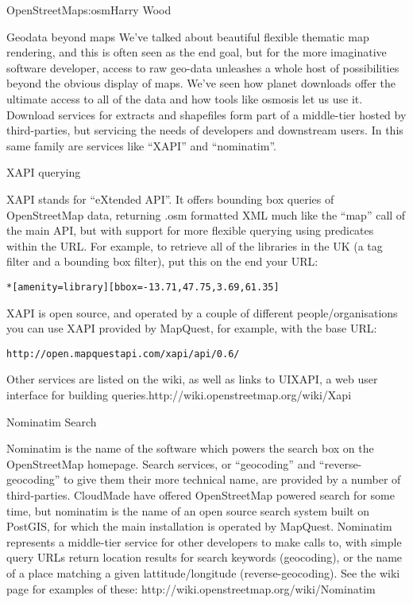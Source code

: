 \begin{aosachapter}{OpenStreetMap}{s:osm}{Harry Wood}
\begin{aosasect1}{Geodata beyond maps}
We've talked about beautiful flexible thematic map rendering, and this
is often seen as the end goal, but for the more imaginative software
developer, access to raw geo-data unleashes a whole host of
possibilities beyond the obvious display of maps. We've seen how
planet downloads offer the ultimate access to all of the data and how
tools like osmosis let us use it. Download services for extracts and
shapefiles form part of a middle-tier hosted by third-parties, but
servicing the needs of developers and downstream users. In this same
family are services like ``XAPI'' and ``nominatim''.

\begin{aosasect2}{XAPI querying}

XAPI stands for ``eXtended API''. It offers bounding box queries of
OpenStreetMap data, returning .osm formatted XML much like the ``map''
call of the main API, but with support for more flexible querying
using predicates within the URL. For example, to retrieve all of the
libraries in the UK (a tag filter and a bounding box filter), put this
on the end your URL:

\begin{verbatim}
*[amenity=library][bbox=-13.71,47.75,3.69,61.35]
\end{verbatim}

XAPI is open source, and operated by a couple of different
people/organisations you can use XAPI provided by MapQuest, for
example, with the base URL:

\begin{verbatim}
http://open.mapquestapi.com/xapi/api/0.6/
\end{verbatim}

Other services are listed on the wiki, as well as links to UIXAPI, a
 web user interface for building
 queries.http://wiki.openstreetmap.org/wiki/Xapi

\end{aosasect2}

\begin{aosasect2}{Nominatim Search}

Nominatim is the name of the software which powers the search box on
the OpenStreetMap homepage. Search services, or ``geocoding'' and
``reverse-geocoding'' to give them their more technical name, are
provided by a number of third-parties. CloudMade have offered
OpenStreetMap powered search for some time, but nominatim is the name
of an open source search system built on PostGIS, for which the main
installation is operated by MapQuest. Nominatim represents a
middle-tier service for other developers to make calls to, with simple
query URLs return location results for search keywords (geocoding), or
the name of a place matching a given lattitude/longitude
(reverse-geocoding). See the wiki page for examples of these:
http://wiki.openstreetmap.org/wiki/Nominatim


\end{aosasect2}
\end{aosasect1}
\end{aosachapter}

